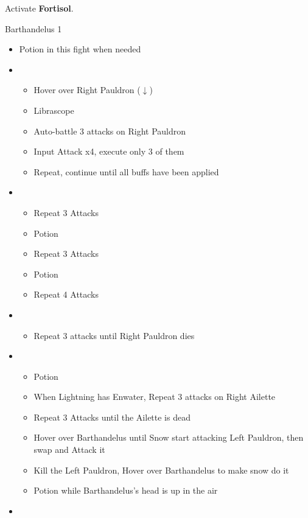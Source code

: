 \begin{paracol}{2}
	Activate \textbf{Fortisol}.

	\begin{battle}{Barthandelus 1}
		\begin{itemize}
			\item Potion in this fight when needed
			\item \first
			      \begin{itemize}
				      \item Hover over Right Pauldron ($\downarrow$)
				      \item Librascope
				      \item Auto-battle 3 attacks on Right Pauldron
				      \item Input Attack x4, execute only 3 of them
				      \item Repeat, continue until all buffs have been applied
			      \end{itemize}
			\item \sixth
			      \begin{itemize}
				      \item Repeat 3 Attacks
				      \item Potion
				      \item Repeat 3 Attacks
				      \item Potion
				      \item Repeat 4 Attacks
			      \end{itemize}
			\item \fifth
			      \begin{itemize}
				      \item Repeat 3 attacks until Right Pauldron dies
			      \end{itemize}
			\item \first
			      \begin{itemize}
				      \item Potion
				      \item When Lightning has Enwater, Repeat 3 attacks on Right Ailette
				      \item Repeat 3 Attacks until the Ailette is dead
				      \item Hover over Barthandelus until Snow start attacking Left Pauldron, then swap and Attack it
				      \item Kill the Left Pauldron, Hover over Barthandelus to make snow do it
				      \item Potion while Barthandelus's head is up in the air
			      \end{itemize}
			\item \second

\end{itemize}
\end{battle}
\end{paracol}
